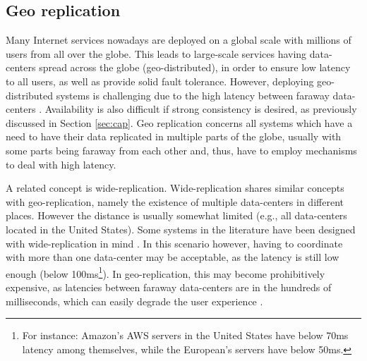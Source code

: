 

\subsection{Geo replication}


Many Internet services nowadays are deployed on a global scale with millions of users from all over the globe.
This leads to large-scale services having data-centers spread across the globe (geo-distributed), in order to ensure low latency to all users, as well as provide solid fault tolerance.
However, deploying geo-distributed systems is challenging due to the high latency between faraway data-centers \cite{mdcc, eiger, chronocache, slog}. Availability is also difficult if strong consistency is desired, as previously discussed in Section \ref{sec:cap}.
Geo replication concerns all systems which have a need to have their data replicated in multiple parts of the globe, usually with some parts being faraway from each other and, thus, have to employ mechanisms to deal with high latency.

A related concept is wide-replication.
Wide-replication shares similar concepts with geo-replication, namely the existence of multiple data-centers in different places. 
However the distance is usually somewhat limited (e.g., all data-centers located in the United States).
Some systems in the literature have been designed with wide-replication in mind \cite{spanner, cops}.
In this scenario however, having to coordinate with more than one data-center may be acceptable, as the latency is still low enough \cite{spanner} (below 100ms\footnote{For instance: Amazon's AWS servers in the United States have below 70ms latency among themselves, while the European's servers have below 50ms.}).
In geo-replication, this may become prohibitively expensive, as latencies between faraway data-centers are in the hundreds of milliseconds, which can easily degrade the user experience \cite{mdcc, eiger, chronocache}.

